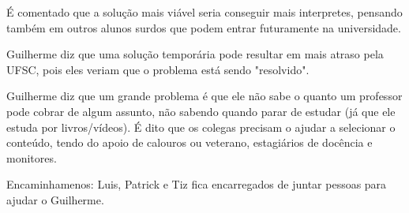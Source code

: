 \documentclass{ata-calico}
\begin{document}
É comentado que a solução mais viável seria conseguir mais interpretes, pensando também em outros alunos surdos que podem entrar futuramente na universidade.

Guilherme diz que uma solução temporária pode resultar em mais atraso pela UFSC, pois eles veriam que o problema está sendo "resolvido".

Guilherme diz que um grande problema é que ele não sabe o quanto um professor pode cobrar de algum assunto, não sabendo quando parar de estudar (já que ele estuda por livros/vídeos). É dito que os colegas precisam o ajudar a selecionar o conteúdo, tendo do apoio de calouros ou veterano, estagiários de docência e monitores. 

Encaminhamenos: Luis, Patrick e Tiz fica encarregados de juntar pessoas para ajudar o Guilherme. 


\end{document}
